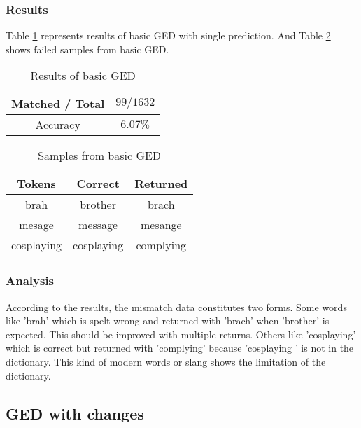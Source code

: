 \documentclass[11pt]{article}
\begin{document}
\subsubsection{Results}
Table \ref{table_6} represents results of basic GED with single prediction. And Table \ref{table_7} shows failed samples from basic GED.\\
\begin{table}[h]
    \begin{center}
        \begin{tabular}{|c|c|}
            \hline
            Matched / Total & $99/1632$ \\ \hline
            Accuracy & $6.07\%$
            \\ \hline
        \end{tabular}
        \caption{Results of basic GED}\label{table_6}
    \end{center}
\end{table}

\begin{table}[h]
    \begin{center}
        \begin{tabular}{|c|c|c|}
            \hline
            Tokens & Correct & Returned \\ \hline
            brah & brother & brach \\ \hline
            mesage & message & mesange \\ \hline
            cosplaying & cosplaying & complying \\ \hline
        \end{tabular}
        \caption{Samples from basic GED}\label{table_7}
    \end{center}
\end{table}
\subsubsection{Analysis}
According to the results, the mismatch data constitutes two forms. Some words like 'brah' which is spelt wrong and returned with 'brach' when 'brother' is expected. This should be improved with multiple returns. Others like 'cosplaying' which is correct but returned with 'complying' because 'cosplaying ' is not in the dictionary. This kind of modern words or slang shows the limitation of the dictionary.
\subsection{GED with changes}
\end{document}
